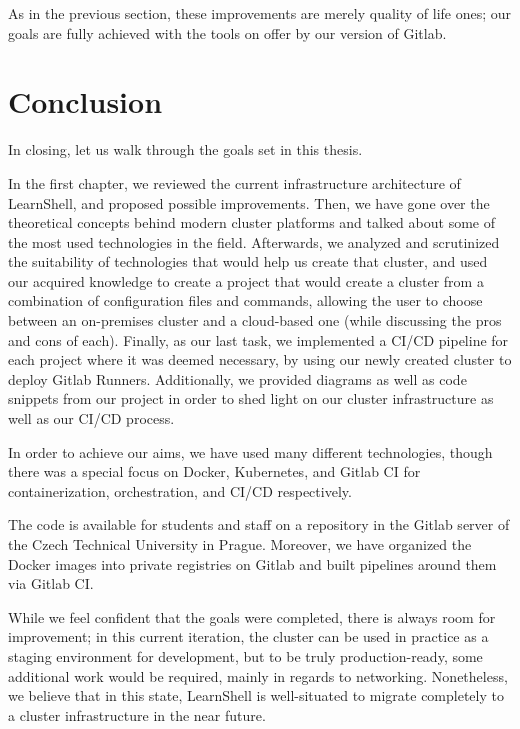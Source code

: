 \documentclass[thesis=B,english]{FITthesis}[2019/12/23]
\begin{document}
As in the previous section, these improvements are merely quality of life ones; our goals are fully achieved with the tools on offer by our version of Gitlab.

\chapter{Conclusion}

In closing, let us walk through the goals set in this thesis. 

In the first chapter, we reviewed the current infrastructure architecture of LearnShell, and proposed possible improvements. Then, we have gone over the theoretical concepts behind modern cluster platforms and talked about some of the most used technologies in the field. Afterwards, we analyzed and scrutinized the suitability of technologies that would help us create that cluster, and used our acquired knowledge to create a project that would create a cluster from a combination of configuration files and commands, allowing the user to choose between an on-premises cluster and a cloud-based one (while discussing the pros and cons of each). Finally, as our last task, we implemented a CI/CD pipeline for each project where it was deemed necessary, by using our newly created cluster to deploy Gitlab Runners. Additionally, we provided diagrams as well as code snippets from our project in order to shed light on our cluster infrastructure as well as our CI/CD process. 

In order to achieve our aims, we have used many different technologies, though there was a special focus on Docker, Kubernetes, and Gitlab CI for containerization, orchestration, and CI/CD respectively.

The code is available for students and staff on a repository in the Gitlab server of the Czech Technical University in Prague. Moreover, we have organized the Docker images into private registries on Gitlab and built pipelines around them via Gitlab CI.

While we feel confident that the goals were completed, there is always room for improvement; in this current iteration, the cluster can be used in practice as a staging environment for development, but to be truly production-ready, some additional work would be required, mainly in regards to networking. Nonetheless, we believe that in this state, LearnShell is well-situated to migrate completely to a cluster infrastructure in the near future.
\end{document}
